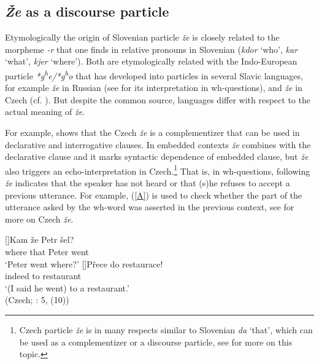 \documentclass[output=paper,
modfonts,
newtxmath,
hidelinks
]{langscibook}
\begin{document}
\subsection{\textit{Že} as a discourse particle}

Etymologically the origin of Slovenian particle \textit{že} is closely related to the morpheme \textit{-r} that one finds in relative pronouns in Slovenian (\textit{kdor} `who', \textit{kar} `what', \textit{kjer} `where'). Both are etymologically related with the Indo-European particle \textit{*g\textsuperscript{h}e/*g\textsuperscript{h}o} that has developed into particles in several Slavic languages, for example \textit{že} in Russian (see \citealt{hagstrommccoy2003} for its interpretation in wh-questions), and \textit{že} in Czech \citep{skrabalova2012} (cf. \citealt{mitrovic2016benj}). But despite the common source, languages differ with respect to the actual meaning of \textit{že}.\enlargethispage{8pt}

For example, \cite{skrabalova2012} shows that the Czech \textit{že} is a complementizer that can be used in declarative and interrogative clauses. In embedded contexts \textit{že} combines with the declarative clause and it marks syntactic dependence of embedded clause, but \textit{že} also triggers an echo-interpretation in Czech.\footnote{Czech particle \textit{že} is in many respects similar to Slovenian \textit{da} `that', which can be used as a complementizer or a discourse particle, see \cite{marusicetal2015} for more on this topic.} That is, in wh-questions, following \cite{skrabalova2012} \textit{že} indicates that the speaker has not heard or that (s)he refuses to accept a previous utterance. For example, (\ref{A}) is used to check whether the part of the utterance asked by the wh-word was asserted in the previous context, see \cite{skrabalova2012} for more on Czech \textit{že}.

\begin{exe} 
\ex\label{A}
\begin{xlist}
[]{\gll Kam  že Petr šel?\\
 	 where that Peter went\\
\glt `Peter went where?'}
[]{\gll Přece do restaurace! \\
	 indeed to restaurant \\
\glt `(I said he went) to a restaurant.'\\
\hfill (Czech; \citealt{skrabalova2012}: 5, (10))}
\end{xlist}
\end{exe}
\end{document}

